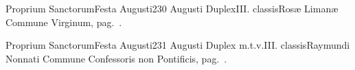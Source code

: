 \documentclass[nocturnale-romanum.tex]{subfiles}
\begin{document}
	{Proprium Sanctorum}{Festa Augusti}{2}{30 Augusti}
	{Duplex}{III. classis}{Rosæ Limanæ}
	{Commune Virginum, pag.\ \pageref{M-MU}.}
	{}

	{Proprium Sanctorum}{Festa Augusti}{2}{31 Augusti}
	{Duplex m.t.v.}{III. classis}{Raymundi Nonnati}
	{Commune Confessoris non Pontificis, pag.\ \pageref{M-CONP}.}
	{}
\end{document}
